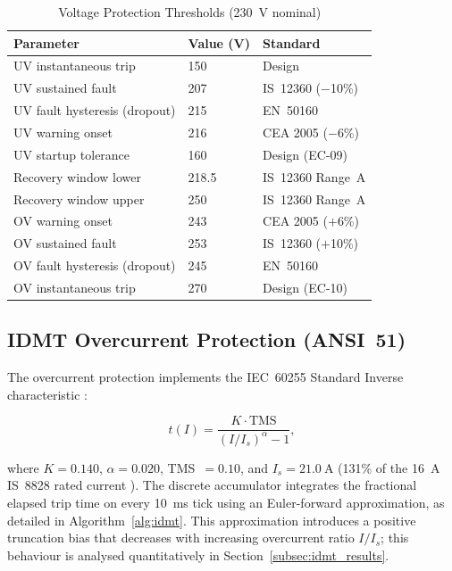 \documentclass[conference]{IEEEtran}
\begin{document}
\begin{table}[t]
  \caption{Voltage Protection Thresholds (\SI{230}{\volt} nominal)}
  \label{tab:vthresh}
  \centering
  \renewcommand{\arraystretch}{1.15}
  \begin{tabular}{lll}
    \toprule
    \textbf{Parameter} & \textbf{Value (V)} & \textbf{Standard} \\
    \midrule
    UV instantaneous trip         & 150   & Design \\
    UV sustained fault            & 207   & IS~12360 ($-$10\%) \\
    UV fault hysteresis (dropout) & 215   & EN~50160 \cite{en50160}\\
    UV warning onset              & 216   & CEA 2005 ($-$6\%) \\
    UV startup tolerance          & 160   & Design (EC-09) \\
    Recovery window lower         & 218.5 & IS~12360 Range~A \\
    Recovery window upper         & 250   & IS~12360 Range~A \\
    OV warning onset              & 243   & CEA 2005 ($+$6\%) \\
    OV sustained fault            & 253   & IS~12360 ($+$10\%) \\
    OV fault hysteresis (dropout) & 245   & EN~50160 \\
    OV instantaneous trip         & 270   & Design (EC-10) \\
    \bottomrule
  \end{tabular}
\end{table}

\subsection{IDMT Overcurrent Protection (ANSI~51)}
\label{subsec:idmt}

The overcurrent protection implements the IEC~60255 Standard Inverse
characteristic \cite{iec60255}:

\begin{equation}
  t(I) = \frac{K \cdot \text{TMS}}{(I / I_s)^\alpha - 1},
  \label{eq:idmt}
\end{equation}

\noindent
where $K = 0.140$, $\alpha = 0.020$, TMS~$= 0.10$, and $I_s =
\SI{21.0}{\ampere}$ (131\% of the \SI{16}{\ampere} IS~8828 rated
current \cite{is8828}).  The discrete accumulator integrates the
fractional elapsed trip time on every \SI{10}{\milli\second} tick using
an Euler-forward approximation, as detailed in Algorithm~\ref{alg:idmt}.
This approximation introduces a positive truncation bias that decreases
with increasing overcurrent ratio $I/I_s$; this behaviour is analysed
quantitatively in Section~\ref{subsec:idmt_results}.
\end{document}
